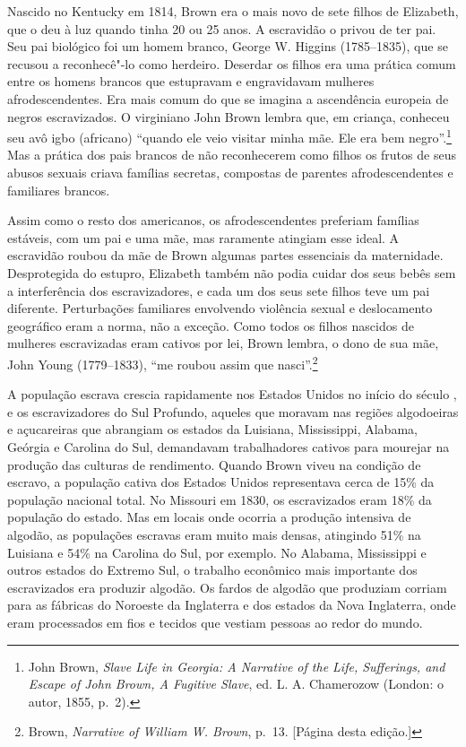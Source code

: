 Nascido no Kentucky em 1814, Brown era o mais novo
de sete filhos de Elizabeth, que o deu à luz quando tinha 20 ou 25 anos.
A escravidão o privou de ter pai. Seu pai biológico foi um homem branco,
George W. Higgins (1785--1835), que se recusou a reconhecê"-lo como
herdeiro. Deserdar os filhos era uma prática comum entre os homens
brancos que estupravam e engravidavam mulheres afrodescendentes. Era
mais comum do que se imagina a ascendência europeia de negros escravizados. O virginiano John Brown lembra que, em criança, conheceu seu avô
igbo (africano) ``quando ele veio visitar minha mãe. Ele era bem
negro''.\footnote{John Brown, \emph{Slave Life in Georgia: A Narrative
  of the Life, Sufferings, and Escape of John Brown, A Fugitive Slave},
  ed. L. A. Chamerozow (London: o autor, 1855, p.~2).} Mas a prática dos
pais brancos de não reconhecerem como filhos os frutos de seus abusos sexuais criava famílias secretas, compostas de parentes afrodescendentes e familiares brancos.

Assim como o resto dos americanos, os afrodescendentes preferiam
famílias estáveis, com um pai e uma mãe, mas raramente atingiam esse
ideal. A escravidão roubou da mãe de Brown algumas partes essenciais da
maternidade. Desprotegida do estupro, Elizabeth também não podia cuidar
dos seus bebês sem a interferência dos escravizadores, e cada um dos
seus sete filhos teve um pai diferente. Perturbações familiares
envolvendo violência sexual e deslocamento geográfico eram a norma, não
a exceção. Como todos os filhos nascidos de mulheres escravizadas eram
cativos por lei, Brown lembra, o dono de sua mãe, John Young
(1779--1833), ``me roubou assim que nasci''.\footnote{Brown,
  \emph{Narrative of William W. Brown}, p.~13. {[}Página \pageref{ref5} desta
  edição.{]}}

A população escrava crescia rapidamente nos Estados Unidos no início
do século , e os escravizadores do Sul Profundo, aqueles que moravam
nas regiões algodoeiras e açucareiras que abrangiam os estados da
Luisiana, Mississippi, Alabama, Geórgia e Carolina do Sul, demandavam
trabalhadores cativos para mourejar na produção das culturas de
rendimento. Quando Brown viveu na condição de escravo, a população cativa dos
Estados Unidos representava cerca de 15\% da população nacional total.
No Missouri em 1830, os escravizados eram 18\% da população do estado.
Mas em locais onde ocorria a produção intensiva de algodão, as
populações escravas eram muito mais densas, atingindo 51\% na
Luisiana e 54\% na Carolina do Sul, por exemplo. No Alabama, Mississippi
e outros estados do Extremo Sul, o trabalho econômico mais importante
dos escravizados era produzir algodão. Os fardos de algodão que
produziam corriam para as fábricas do Noroeste da Inglaterra e dos
estados da Nova Inglaterra, onde eram processados em fios e tecidos que
vestiam pessoas ao redor do mundo.

